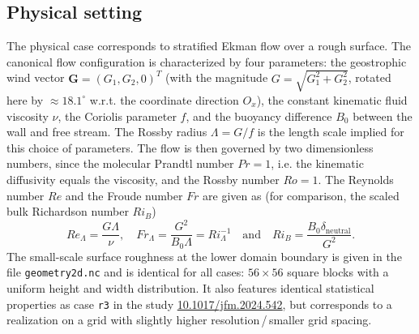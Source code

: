 \documentclass[11pt]{article}
\newcommand{\printdoi}[1]{\href{https://dx.doi.org/#1}{#1}}
\begin{document}
\subsection{Physical setting}
The physical case corresponds to stratified Ekman flow over a rough surface. The canonical flow configuration is characterized by four parameters: the geostrophic wind vector \linebreak $\mathbf{G}=\left(G_1,G_2,0\right)^T$ (with the magnitude $G=\sqrt{G_1^2+G_2^2}$, rotated here by $\approx18.1^\circ$ w.r.t. the coordinate direction $O_x$), the constant kinematic fluid viscosity $\nu$, the Coriolis parameter $f$, and the buoyancy difference $B_0$ between the wall and free stream. The Rossby radius $\Lambda=G/f$ is the length scale implied for this choice of parameters. 
%
The flow is then governed by two dimensionless numbers, since the molecular Prandtl number $Pr=1$, i.e. the kinematic diffusivity equals the viscosity, and the Rossby number $Ro=1$. The Reynolds number $Re$ and the Froude number $Fr$ are given as (for comparison, the scaled bulk Richardson number $Ri_B$)
% 
\begin{equation}
    Re_\Lambda = \frac{G \Lambda}{\nu},\quad
    Fr_\Lambda=\frac{G^2}{B_0 \Lambda}=Ri_\Lambda^{-1}\quad \mathrm{and} \quad
    Ri_{B} = \frac{B_0 \delta_\mathrm{neutral}}{G^2}.
\end{equation}
%
The small-scale surface roughness at the lower domain boundary is given in the file \linebreak \texttt{geometry2d.nc} and is identical for all cases: $56 \times 56$ square blocks with a uniform height and width distribution. It also features identical statistical properties as case \texttt{r3} in the study \linebreak \printdoi{10.1017/jfm.2024.542}, but corresponds to a realization on a grid with slightly higher resolution\,/\,smaller grid spacing.
%
\end{document}
